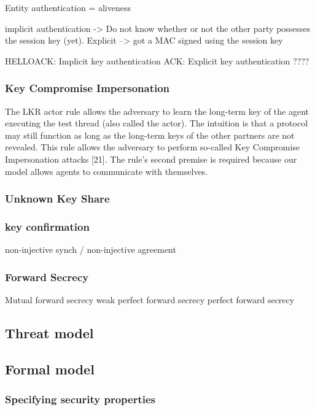 Entity authentication = aliveness


implicit authentication -> Do not know whether or not the other party possesses the session key (yet). Explicit --> got a MAC signed using the session key


HELLOACK: Implicit key authentication
ACK: Explicit key authentication ????

\subsubsection{Key Compromise Impersonation}


The LKR actor rule allows the adversary to learn the long-term key of the agent executing the test thread (also called the actor). The intuition is that a protocol may still function as long as the long-term keys of the other partners are not revealed. This rule allows the adversary to perform so-called Key Compromise Impersonation attacks [21]. The rule's second premise is required because our model allows agents to communicate with themselves.

\subsubsection{Unknown Key Share}

\subsubsection{key confirmation}

non-injective synch / non-injective agreement

\subsubsection{Forward Secrecy}

Mutual forward secrecy
weak perfect forward secrecy
perfect forward secrecy


\subsection{Threat model}

\subsection{Formal model}

\subsubsection{Specifying security properties}

